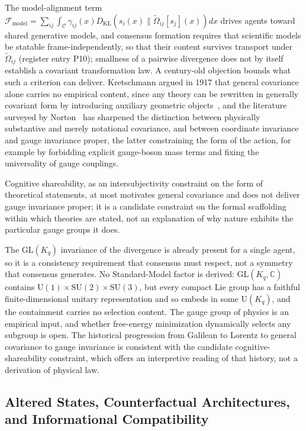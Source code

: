 The model-alignment term $\mathcal{F}_{\text{model}} = \sum_{ij} \int_{\mathcal{C}} \gamma_{ij}(x) D_{\mathrm{KL}}(s_i(x) \| \tilde{\Omega}_{ij}[s_j](x)) dx$ drives agents toward shared generative models, and consensus formation requires that scientific models be statable frame-independently, so that their content survives transport under $\tilde{\Omega}_{ij}$ (register entry P10); smallness of a pairwise divergence does not by itself establish a covariant transformation law. A century-old objection bounds what such a criterion can deliver. Kretschmann argued in 1917 that general covariance alone carries no empirical content, since any theory can be rewritten in generally covariant form by introducing auxiliary geometric objects~\cite{Kretschmann1917}, and the literature surveyed by Norton~\cite{Norton1993} has sharpened the distinction between physically substantive and merely notational covariance, and between coordinate invariance and gauge invariance proper, the latter constraining the form of the action, for example by forbidding explicit gauge-boson mass terms and fixing the universality of gauge couplings.
\begin{remark}\label{rem:kretschmann}
Cognitive shareability, as an intersubjectivity constraint on the form of theoretical statements, at most motivates general covariance and does not deliver gauge invariance proper; it is a candidate constraint on the formal scaffolding within which theories are stated, not an explanation of why nature exhibits the particular gauge groups it does.
\end{remark}
The $\mathrm{GL}(K_q)$ invariance of the divergence is already present for a single agent, so it is a consistency requirement that consensus must respect, not a symmetry that consensus generates. No Standard-Model factor is derived: $\mathrm{GL}(K_q, \mathbb{C})$ contains $\mathrm{U}(1) \times \mathrm{SU}(2) \times \mathrm{SU}(3)$, but every compact Lie group has a faithful finite-dimensional unitary representation and so embeds in some $\mathrm{U}(K_q)$, and the containment carries no selection content. The gauge group of physics is an empirical input, and whether free-energy minimization dynamically selects any subgroup is open. The historical progression from Galilean to Lorentz to general covariance to gauge invariance is consistent with the candidate cognitive-shareability constraint, which offers an interpretive reading of that history, not a derivation of physical law.

\subsection{Altered States, Counterfactual Architectures, and Informational Compatibility}

